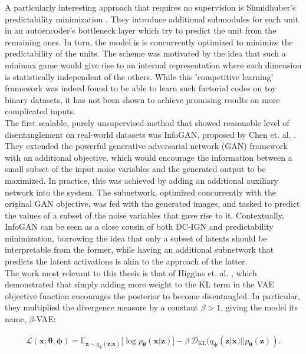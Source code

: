 \documentclass{report}
\begin{document}
\noindent A particularly interesting approach that requires no supervision is Shmidhuber's predictability minimization \cite{pred-min-schmidhuber}. They introduce additional submodules for each unit in an autoencoder's bottleneck layer which try to predict the unit from the remaining ones. In turn, the model is is concurrently optimized to minimize the predictability of the units. The scheme was motivated by the idea that such a minimax game would give rise to an internal representation where each dimension is statistically independent of the others. While this 'competitive learning' framework was indeed found to be able to learn such factorial codes on toy binary datasets, it has not been shown to achieve promising results on more complicated inputs. \\

\noindent The first scalable, purely unsupervised method that showed reasonable level of disentanglement on real-world datasets was InfoGAN, proposed by Chen et. al. \cite{infogan}. They extended the powerful generative adversarial network (GAN) framework \cite{gan} with an additional objective, which would encourage the information between a small subset of the input noise variables and the generated output to be maximized. In practice, this was achieved by adding an additional auxiliary network into the system. The subnetwork, optimized concurrently with the original GAN objective, was fed with the generated images, and tasked to predict the values of a subset of the noise variables that gave rise to it. Contextually, InfoGAN can be seen as a close cousin of both DC-IGN and predictability minimization, borrowing the idea that only a subset of latents should be interpretable from the former, while having an additional subnetwork that predicts the latent activations is akin to the approach of the latter. \\

\noindent The work most relevant to this thesis is that of Higgins et. al. \cite{beta-vae}, which demonstrated that simply adding more weight to the KL term in the VAE objective function encourages the posterior to become disentangled. In particular, they multiplied the divergence measure by a constant $\beta > 1$, giving the model its name, $\beta$-VAE:

\begin{equation}
\begin{gathered}
\mathcal{L}(\boldsymbol{x}; \boldsymbol{\theta}, \boldsymbol{\phi}) =
\mathbb{E}_{\boldsymbol{z} \sim q_{\boldsymbol{\phi}}(\boldsymbol{z}|\boldsymbol{x})} \big[ \log p_{\boldsymbol{\theta}} (\boldsymbol{x} | \boldsymbol{z}) \big] - \beta \, \mathcal{D}_\text{KL}(q_{\boldsymbol{\phi}}(\boldsymbol{z}|\boldsymbol{x}) || p_{\boldsymbol{\theta}}(\boldsymbol{z})).
\end{gathered}
\label{eq:beta-vae}
\end{equation}
\end{document}
